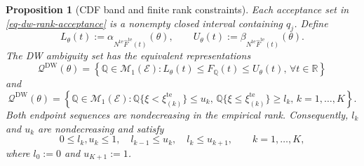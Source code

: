 \documentclass[review,11pt,3p,authoryear,nopreprintline]{elsarticle}
\newtheorem{proposition}{Proposition}
\begin{document}
\begin{proposition}[CDF band and finite rank constraints]
  \label{prop-finite-rank-constraints}
  Each acceptance set in \eqref{eq-dw-rank-acceptance} is a nonempty closed interval containing $q_j$. Define
  \[
    L_\theta(t):=\alpha_{N^{\mathrm{te}}\widehat F^{\mathrm{te}}(t)}(\theta),
    \qquad
    U_\theta(t):=\beta_{N^{\mathrm{te}}\widehat F^{\mathrm{te}}(t)}(\theta).
  \]
  The DW ambiguity set has the equivalent representations
  \begin{equation}
    \mathcal Q^{\mathrm{DW}}(\theta) =\left\{\mathbb Q\in\mathcal M_1(\mathcal E): L_\theta(t)\le F_{\mathbb Q}(t)\le U_\theta(t), \, \forall t\in\mathbb R\right\}
    \label{eq-dw-band-representation}
  \end{equation}
  and
  \begin{equation}
    \mathcal Q^{\mathrm{DW}}(\theta)
    =\left\{\mathbb Q\in\mathcal M_1(\mathcal E): \mathbb Q\{\xi<\xi_{(k)}^{\mathrm{te}}\}\le u_k, \, \mathbb Q\{\xi\le \xi_{(k)}^{\mathrm{te}}\}\ge l_k, \, k=1,\ldots,K \right\}.
    \label{eq-finite-rank-constraints}
  \end{equation}
  Both endpoint sequences are nondecreasing in the empirical rank. Consequently, $l_k$ and $u_k$ are nondecreasing and satisfy
  \begin{equation}
    0\le l_k,u_k\le1,\quad
    l_{k-1}\le u_k,\quad
    l_k\le u_{k+1},
    \qquad k=1,\ldots,K,
    \label{eq-rank-compatibility}
  \end{equation}
  where $l_0:=0$ and $u_{K+1}:=1$.
\end{proposition}
\end{document}
